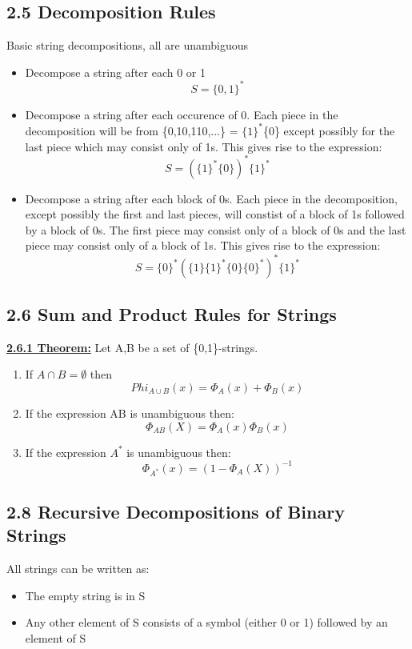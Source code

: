 \documentclass[12pt]{article}
\newcommand{\myt}[1]{\textbf{\underline{#1}}}
\begin{document}
	\subsection*{2.5 Decomposition Rules}
	Basic string decompositions, all are unambiguous\\
	\begin{itemize}
		\item Decompose a string after each 0 or 1\\
		$$S = \{0,1\}^*$$
		\item Decompose a string after each occurence of 0. Each piece in the decomposition will be from \{0,10,110,...\} = $\{1\}^*$\{0\} except possibly for the last piece which may consist only of 1s. This gives rise to the expression:\\
		$$S = (\{1\}^*\{0\})^*\{1\}^*$$
		\item Decompose a string after each block of 0s. Each piece in the decomposition, except possibly the first and last pieces, will constist of a block of 1s followed by a block of 0s. The first piece may consist only of a block of 0s and the last piece may consist only of a block of 1s. This gives rise to the expression:\\
		$$S = \{0\}^*(\{1\}\{1\}^*\{0\}\{0\}^*)^*\{1\}^*$$
	\end{itemize}
	
	\subsection*{2.6 Sum and Product Rules for Strings}
	\myt{2.6.1 Theorem:} Let A,B be a set of \{0,1\}-strings. \\
	\begin{enumerate}
		\item If $A \cap B = \emptyset$ then\\
		$$Phi_{A \cup B}(x) = \Phi_A(x) + \Phi_B(x)$$
		\item If the expression AB is unambiguous then:\\
		$$\Phi_{AB}(X) = \Phi_A(x)\Phi_B(x)$$
		\item If the expression $A^*$ is unambiguous then:\\
		$$\Phi_{A^*}(x) = (1-\Phi_A(X))^{-1}$$
	\end{enumerate}
	
	\subsection*{2.8 Recursive Decompositions of Binary Strings}
	All strings can be written as:
	\begin{itemize}
		\item The empty string is in S
		\item Any other element of S consists of a symbol (either 0 or 1) followed by an element of S
	\end{itemize}
	
\end{document}
